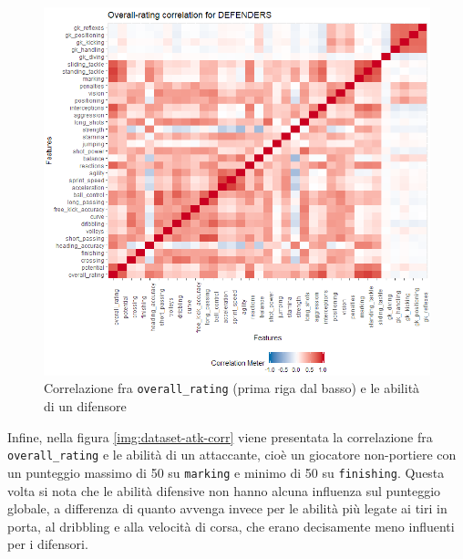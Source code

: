 \documentclass[hidelinks, 12pt]{article}
\begin{document}
\begin{figure}[H]
	\centering
	\includegraphics[scale=0.8]{images/04_04_def_corr.png}
	\caption[Correlazione fra \texttt{overall\_rating} (prima riga dal basso) e le abilità di un difensore]{Correlazione fra \texttt{overall\_rating} (prima riga dal basso) e le abilità di un difensore}
	\label{img:dataset-def-corr}
\end{figure}

\pagebreak
Infine, nella figura \ref{img:dataset-atk-corr} viene presentata la correlazione fra \texttt{overall\_rating} e le abilità di un attaccante, cioè un giocatore non-portiere con un punteggio massimo di 50 su \texttt{marking} e minimo di 50 su \texttt{finishing}. Questa volta si nota che le abilità difensive non hanno alcuna influenza sul punteggio globale, a differenza di quanto avvenga invece per le abilità più legate ai tiri in porta, al dribbling e alla velocità di corsa, che erano decisamente meno influenti per i difensori.
\end{document}
